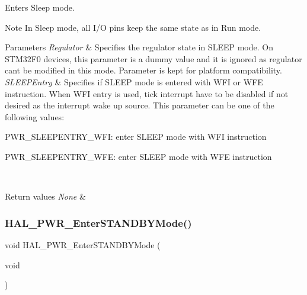 Enters Sleep mode. 

\begin{DoxyNote}{Note}
In Sleep mode, all I/O pins keep the same state as in Run mode. 
\end{DoxyNote}

\begin{DoxyParams}{Parameters}
{\em Regulator} & Specifies the regulator state in S\+L\+E\+EP mode. On S\+T\+M32\+F0 devices, this parameter is a dummy value and it is ignored as regulator can\textquotesingle{}t be modified in this mode. Parameter is kept for platform compatibility. \\
\hline
{\em S\+L\+E\+E\+P\+Entry} & Specifies if S\+L\+E\+EP mode is entered with W\+FI or W\+FE instruction. When W\+FI entry is used, tick interrupt have to be disabled if not desired as the interrupt wake up source. This parameter can be one of the following values\+: \begin{DoxyItemize}
\item P\+W\+R\+\_\+\+S\+L\+E\+E\+P\+E\+N\+T\+R\+Y\+\_\+\+W\+FI\+: enter S\+L\+E\+EP mode with W\+FI instruction \item P\+W\+R\+\_\+\+S\+L\+E\+E\+P\+E\+N\+T\+R\+Y\+\_\+\+W\+FE\+: enter S\+L\+E\+EP mode with W\+FE instruction \end{DoxyItemize}
\\
\hline
\end{DoxyParams}

\begin{DoxyRetVals}{Return values}
{\em None} & \\
\hline
\end{DoxyRetVals}
\mbox{\label{group___p_w_r___exported___functions___group2_ga40736f74c169077fcd08f34470559aa2}} 
\subsubsection{\texorpdfstring{H\+A\+L\+\_\+\+P\+W\+R\+\_\+\+Enter\+S\+T\+A\+N\+D\+B\+Y\+Mode()}{HAL\_PWR\_EnterSTANDBYMode()}}
{\footnotesize\ttfamily void H\+A\+L\+\_\+\+P\+W\+R\+\_\+\+Enter\+S\+T\+A\+N\+D\+B\+Y\+Mode (\begin{DoxyParamCaption}\item[{void}]{ }\end{DoxyParamCaption})}



